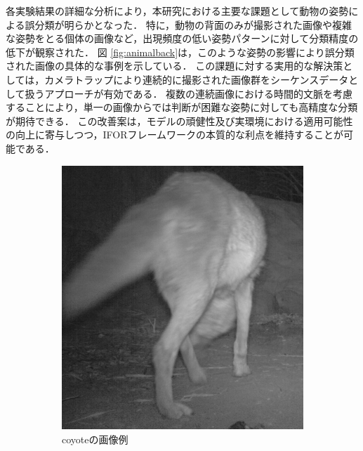 各実験結果の詳細な分析により，本研究における主要な課題として動物の姿勢による誤分類が明らかとなった．
特に，動物の背面のみが撮影された画像や複雑な姿勢をとる個体の画像など，出現頻度の低い姿勢パターンに対して分類精度の低下が観察された．
図 \ref{fig:animalback}は，このような姿勢の影響により誤分類された画像の具体的な事例を示している．
この課題に対する実用的な解決策としては，カメラトラップにより連続的に撮影された画像群をシーケンスデータとして扱うアプローチが有効である．
複数の連続画像における時間的文脈を考慮することにより，単一の画像からでは判断が困難な姿勢に対しても高精度な分類が期待できる．
この改善案は，モデルの頑健性及び実環境における適用可能性の向上に寄与しつつ，IFORフレームワークの本質的な利点を維持することが可能である．

\begin{figure}[tbp]
  \centering
  \begin{subfigure}[b]{0.45\linewidth}
    \centering
    \includegraphics[height=0.9\linewidth, keepaspectratio]{image/coyote.png}
    \caption{coyoteの画像例}
    \label{fig:coyote}
  \end{subfigure}
  \hfill
  \begin{subfigure}[b]{0.45\linewidth}
    \centering

\end{subfigure}
\end{figure}

